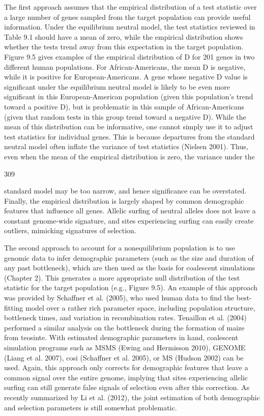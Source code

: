 \documentclass{article}
\begin{document}
The first approach assumes that the empirical distribution of a test statistic over a large number of genes sampled from the target population can provide useful information. Under the equilibrium neutral model, the test statistics reviewed in Table 9.1 should have a mean of zero, while the empirical distribution shows whether the tests trend away from this expectation in the target population. Figure 9.5 gives examples of the empirical distribution of D for 201 genes in two different human populations. For African-Americans, the mean D is negative, while it is positive for European-Americans. A gene whose negative D value is significant under the equilibrium neutral model is likely to be even more significant in this European-American population (given this population's trend toward a positive D), but is problematic in this sample of African-Americans (given that random tests in this group trend toward a negative D). While the mean of this distribution can be informative, one cannot simply use it to adjust test statistics for individual genes. This is because departures from the standard neutral model often inflate the variance of test statistics (Nielsen 2001). Thus, even when the mean of the empirical distribution is zero, the variance under the

309

standard model may be too narrow, and hence significance can be overstated. Finally, the empirical distribution is largely shaped by common demographic features that influence all genes. Allelic surfing of neutral alleles does not leave a constant genome-wide signature, and sites experiencing surfing can easily create outliers, mimicking signatures of selection.

The second approach to account for a nonequilibrium population is to use genomic data to infer demographic parameters (such as the size and duration of any past bottleneck), which are then used as the basis for coalescent simulations (Chapter 2). This generates a more appropriate null distribution of the test statistic for the target population (e.g., Figure 9.5). An example of this approach was provided by Schaffner et al. (2005), who used human data to find the best-fitting model over a rather rich parameter space, including population structure, bottleneck times, and variation in recombination rates. Tenaillon et al. (2004) performed a similar analysis on the bottleneck during the formation of maize from teosinte. With estimated demographic parameters in hand, coalescent simulation programs such as MSMS (Ewing and Hermisson 2010), GENOME (Liang et al. 2007), cosi (Schaffner et al. 2005), or MS (Hudson 2002) can be used. Again, this approach only corrects for demographic features that leave a common signal over the entire genome, implying that sites experiencing allelic surfing can still generate false signals of selection even after this correction. As recently summarized by Li et al. (2012), the joint estimation of both demographic and selection parameters is still somewhat problematic.
\end{document}
